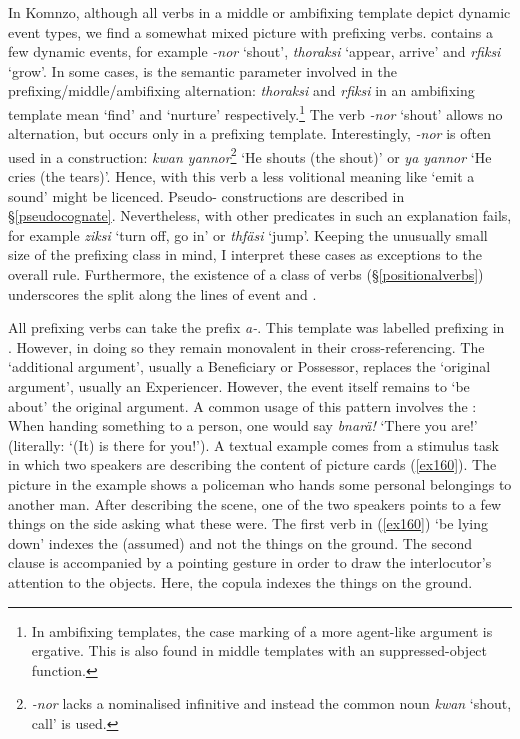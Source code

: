 In Komnzo, although all verbs in a middle or ambifixing template depict dynamic event types, we find a somewhat mixed picture with prefixing verbs.  contains a few dynamic events, for example \emph{-nor} `shout', \emph{thoraksi} `appear, arrive' and \emph{rfiksi} `grow'. In some cases,  is the semantic parameter involved in the prefixing/middle/ambifixing alternation: \emph{thoraksi} and \emph{rfiksi} in an ambifixing  template mean `find' and `nurture' respectively.\footnote{In ambifixing templates, the case marking of a more agent-like argument is ergative. This is also found in middle templates with an suppressed-object function.} The verb \emph{-nor} `shout' allows no alternation, but occurs only in a prefixing template. Interestingly, \emph{-nor} is often used in a  construction: \emph{kwan yannor}\footnote{\emph{-nor} lacks a nominalised infinitive and instead the common noun \emph{kwan} `shout, call' is used.} `He shouts (the shout)' or \emph{ya yannor} `He cries (the tears)'. Hence, with this verb a less volitional meaning like `emit a sound' might be licenced. Pseudo- constructions are described in \S{}\ref{pseudocognate}. Nevertheless, with other predicates in  such an explanation fails, for example \emph{ziksi} `turn off, go in' or \emph{thfäsi} `jump'. Keeping the unusually small size of the prefixing class in mind, I interpret these cases as exceptions to the overall rule. Furthermore, the existence of a class of  verbs (\S{}\ref{positionalverbs}) underscores the split along the lines of event  and .%

All prefixing verbs can take the  prefix \emph{a-}. This template was labelled  prefixing in . However, in doing so they remain monovalent in their cross-referencing. The `additional argument', usually a Beneficiary or Possessor, replaces the `original argument', usually an Experiencer. However, the event itself remains to `be about' the original argument. A common usage of this pattern involves the : When handing something to a person, one would say \emph{bnarä!} `There you are!' (literally: `(It) is there for you!'). A textual example comes from a stimulus task in which two speakers are describing the content of picture cards (\ref{ex160}). The picture in the example shows a policeman who hands some personal belongings to another man. After describing the scene, one of the two speakers points to a few things on the side asking what these were. The first verb in (\ref{ex160}) `be lying down' indexes the (assumed)  and not the things on the ground. The second clause is accompanied by a pointing gesture in order to draw the interlocutor's attention to the objects. Here, the copula indexes the things on the ground.

